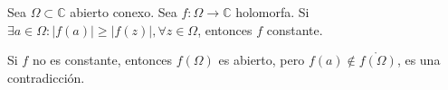 \begin{theo}
  Sea $\Omega \subset \mathbb{C}$ abierto conexo. Sea $f : \Omega \to \mathbb{C}$ holomorfa. Si $\exists a \in \Omega : | f(a) | \geq | f(z) |, \forall z \in \Omega$, entonces $f$ constante.
\end{theo}

\begin{dem}
  Si $f$ no es constante, entonces $f(\Omega)$ es abierto, pero $f(a) \not \in \mathring{f(\Omega)}$, es una contradicción.
\end{dem}
